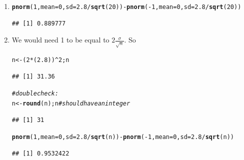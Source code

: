 \documentclass[twoside]{book}\usepackage[]{graphicx}\usepackage[]{xcolor}
\makeatletter
\newcommand{\hlnum}[1]{\textcolor[rgb]{0.686,0.059,0.569}{#1}}%
\newcommand{\hlcom}[1]{\textcolor[rgb]{0.678,0.584,0.686}{\textit{#1}}}%
\newcommand{\hlopt}[1]{\textcolor[rgb]{0,0,0}{#1}}%
\newcommand{\hlstd}[1]{\textcolor[rgb]{0.345,0.345,0.345}{#1}}%
\newcommand{\hlkwb}[1]{\textcolor[rgb]{0.69,0.353,0.396}{#1}}%
\newcommand{\hlkwc}[1]{\textcolor[rgb]{0.333,0.667,0.333}{#1}}%
\newcommand{\hlkwd}[1]{\textcolor[rgb]{0.737,0.353,0.396}{\textbf{#1}}}%
\newenvironment{kframe}{%
 \def\at@end@of@kframe{}%
 \ifinner\ifhmode%
  \def\at@end@of@kframe{\end{minipage}}%
  \begin{minipage}{\columnwidth}%
 \fi\fi%
 \def\FrameCommand##1{\hskip\@totalleftmargin \hskip-\fboxsep
 \colorbox{shadecolor}{##1}\hskip-\fboxsep
     \hskip-\linewidth \hskip-\@totalleftmargin \hskip\columnwidth}%
 \MakeFramed {\advance\hsize-\width
   \@totalleftmargin\z@ \linewidth\hsize
   \@setminipage}}%
 {\par\unskip\endMakeFramed%
 \at@end@of@kframe}
\newenvironment{knitrout}{}{} %
\makeatother
\begin{document}
\begin{solution}
	\begin{enumerate}
		 \item
\begin{knitrout}
\color{fgcolor}\begin{kframe}
\begin{alltt}
\hlkwd{pnorm}\hlstd{(} \hlnum{1}\hlstd{,} \hlkwc{mean}\hlstd{=}\hlnum{0}\hlstd{,} \hlkwc{sd}\hlstd{=}\hlnum{2.8}\hlopt{/}\hlkwd{sqrt}\hlstd{(}\hlnum{20}\hlstd{) )} \hlopt{-} \hlkwd{pnorm}\hlstd{(} \hlopt{-}\hlnum{1}\hlstd{,} \hlkwc{mean}\hlstd{=}\hlnum{0}\hlstd{,} \hlkwc{sd}\hlstd{=}\hlnum{2.8}\hlopt{/}\hlkwd{sqrt}\hlstd{(}\hlnum{20}\hlstd{) )}
\end{alltt}
\begin{verbatim}
## [1] 0.889777
\end{verbatim}
\end{kframe}
\end{knitrout}
		 \item
			 We would need 1 to be equal to $2 \frac{\sigma}{\sqrt n}$. So
\begin{knitrout}
\color{fgcolor}\begin{kframe}
\begin{alltt}
\hlstd{n} \hlkwb{<-} \hlstd{(} \hlnum{2} \hlopt{*} \hlstd{(}\hlnum{2.8}\hlstd{) )}\hlopt{^}\hlnum{2}\hlstd{; n}
\end{alltt}
\begin{verbatim}
## [1] 31.36
\end{verbatim}
\begin{alltt}
\hlcom{# double check:}
\hlstd{n} \hlkwb{<-} \hlkwd{round}\hlstd{(n); n}  \hlcom{# should have an integer}
\end{alltt}
\begin{verbatim}
## [1] 31
\end{verbatim}
\begin{alltt}
\hlkwd{pnorm}\hlstd{(} \hlnum{1}\hlstd{,} \hlkwc{mean}\hlstd{=}\hlnum{0}\hlstd{,} \hlkwc{sd}\hlstd{=}\hlnum{2.8}\hlopt{/}\hlkwd{sqrt}\hlstd{(n) )} \hlopt{-} \hlkwd{pnorm}\hlstd{(} \hlopt{-}\hlnum{1}\hlstd{,} \hlkwc{mean}\hlstd{=}\hlnum{0}\hlstd{,} \hlkwc{sd}\hlstd{=}\hlnum{2.8}\hlopt{/}\hlkwd{sqrt}\hlstd{(n) )}
\end{alltt}
\begin{verbatim}
## [1] 0.9532422
\end{verbatim}
\end{kframe}
\end{knitrout}


\end{enumerate}
\end{solution}
\end{document}

